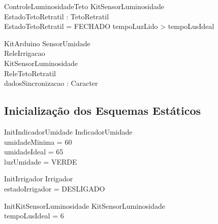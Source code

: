             \begin{schema}{ControleLuminosidadeTeto}
                KitSensorLuminosidade \\
                EstadoTetoRetratil : TetoRetratil \\
            \where
                EstadoTetoRetratil = FECHADO \iff tempoLuzLido > tempoLusIdeal \\
            \end{schema}

            \begin{schema}{KitArduino}
                SensorUmidade \\
                ReleIrrigacao \\
                KitSensorLuminosidade \\
                ReleTetoRetratil \\
                dadosSincronizacao : \seq Caracter \\
            \end{schema}

        \subsection{Inicialização dos Esquemas Estáticos}

            \begin{schema}{InitIndicadorUmidade}
                \Delta IndicadorUmidade \\
            \where
                umidadeMinima = 60 \\
                umidadeIdeal = 65 \\
                luzUmidade = VERDE \\
            \end{schema}

            \begin{schema}{InitIrrigador}
                \Delta Irrigador \\
            \where
                estadoIrrigador = DESLIGADO \\
            \end{schema}

            \begin{schema}{InitKitSensorLuminosidade}
                \Delta KitSensorLuminosidade \\
            \where
                tempoLusIdeal = 6 \\
            \end{schema}

